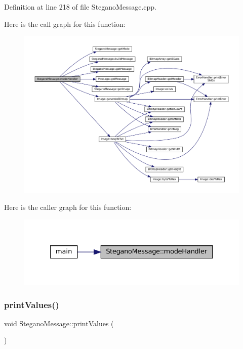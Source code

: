 Definition at line 218 of file Stegano\+Message.\+cpp.

Here is the call graph for this function\+:\nopagebreak
\begin{figure}[H]
\begin{center}
\leavevmode
\includegraphics[width=350pt]{classSteganoMessage_a2649e515941e730520b759282d00dcd6_cgraph}
\end{center}
\end{figure}
Here is the caller graph for this function\+:\nopagebreak
\begin{figure}[H]
\begin{center}
\leavevmode
\includegraphics[width=328pt]{classSteganoMessage_a2649e515941e730520b759282d00dcd6_icgraph}
\end{center}
\end{figure}
\mbox{\label{classSteganoMessage_a3ea3f5ff720bf56d33f168d47e2897b0}} 
\subsubsection{\texorpdfstring{printValues()}{printValues()}}
{\footnotesize\ttfamily void Stegano\+Message\+::print\+Values (\begin{DoxyParamCaption}{ }\end{DoxyParamCaption})}



